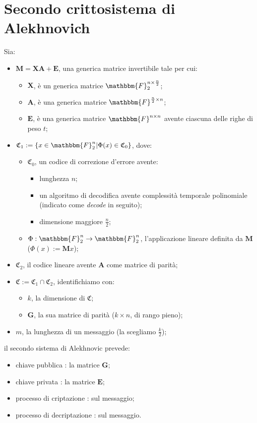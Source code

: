 \documentclass[12pt, a4paper]{report}
\theoremstyle{definition}
\begin{document}
		\section{Secondo crittosistema di Alekhnovich \cite{9}}
			Sia:
			\begin{itemize}
				\item $\mathbf{M}=\mathbf{XA}+\mathbf{E}$, una generica matrice invertibile tale per cui:
					\begin{itemize}
						\item $\mathbf{X}$, è un generica matrice $\mathbbm{F}_2^{n\times\frac{n}{2}}$;
						\item $\mathbf{A}$, è una generica matrice $\mathbbm{F}^{\frac{n}{2}\times n}$;
						\item $\mathbf{E}$, è una generica matrice $\mathbbm{F}^{n\times n}$ avente ciascuna delle righe di peso $t$;
					\end{itemize}
				\item $\mathfrak{C}_1:=\{x\in\mathbbm{F}_2^{n}|\Phi(x)\in\mathfrak{C}_0\}$, dove:
					\begin{itemize}
						\item $\mathfrak{C}_0$, un codice di correzione d’errore avente:
							\begin{itemize}
								\item lunghezza $n$;
								\item un algoritmo di decodifica avente complessità temporale polinomiale (indicato come \emph{decode} in seguito);
								\item dimensione maggiore $\frac{n}{2}$;
							\end{itemize}
						\item $\Phi:\mathbbm{F}_2^n\rightarrow \mathbbm{F}_2^n$, l’applicazione lineare definita da $\mathbf{M}$ ($\Phi(x):=\mathbf{M}x$);
					\end{itemize}
				\item $\mathfrak{C}_2$, il codice lineare avente $\mathbf{A}$ come matrice di parità;
				\item $\mathfrak{C}:=\mathfrak{C}_1 \cap \mathfrak{C}_2$, identifichiamo con:
					\begin{itemize}
						\item $k$, la dimensione di $\mathfrak{C}$;
						\item $\mathbf{G}$, la sua matrice di parità ($k\times n$, di rango pieno);
					\end{itemize}
				\item $m$, la lunghezza di un messaggio (la scegliamo $\frac{k}{2}$);
			\end{itemize}
			il secondo sistema di Alekhnovic prevede:
				\begin{itemize}
					\item chiave pubblica : la matrice $\mathbf{G}$;
					\item chiave privata : la matrice $\mathbf{E}$;
					\item processo di criptazione : sul messaggio;
					\item processo di decriptazione : sul messaggio.
				\end{itemize}
			\algThree
			\algFour
\end{document}
